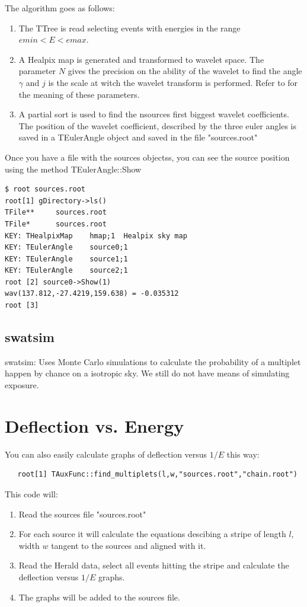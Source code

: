 \documentclass[12pt]{article}
\begin{document}
The algorithm goes as follows:
\begin{enumerate}
\item The TTree is read selecting events with energies in the range $emin < E < emax$.
\item A Healpix map is generated and transformed to wavelet space. The parameter $N$
gives the precision on the ability of the wavelet to find the angle $\gamma$ and $j$
is the scale at witch the wavelet transform is performed. Refer to \cite{gap} for
the meaning of these parameters.
\item A partial sort is used to find the nsources first biggest wavelet coefficients.
The position of the wavelet coefficient, described by the three euler angles is
saved in a TEulerAngle object and saved in the file {\color{brown}"sources.root"}
\end{enumerate}
Once you have a file with the sources objectss, you can see the source position using
the method {\color{brown}TEulerAngle::Show}
{ \color{brown}
\begin{lstlisting}
$ root sources.root
root[1] gDirectory->ls()
TFile**		sources.root	
TFile*		sources.root	
KEY: THealpixMap	hmap;1	Healpix sky map
KEY: TEulerAngle	source0;1	
KEY: TEulerAngle	source1;1	
KEY: TEulerAngle	source2;1	
root [2] source0->Show(1)
wav(137.812,-27.4219,159.638) = -0.035312
root [3] 
\end{lstlisting}
}

\subsection{swatsim}
swatsim: Uses Monte Carlo simulations to calculate the probability of a multiplet happen by 
chance on a isotropic sky. We still do not have means of simulating exposure.

\section{Deflection vs. Energy} \label{ch::raios-cosmicos}
You can also easily calculate graphs of deflection versus $1/E$ this way:
{ \color{brown}
   \begin{lstlisting}
   root[1] TAuxFunc::find_multiplets(l,w,"sources.root","chain.root")
   \end{lstlisting}
}
This code will:
\begin{enumerate}
\item Read the sources file {\color{brown}"sources.root"}
\item For each source it will calculate the equations descibing a stripe of
length $l$, width $w$ tangent to the sources and aligned with it.
\item Read the Herald data, select all events hitting the stripe and calculate 
the deflection versus $1/E$ graphs.
\item The graphs will be added to the sources file.
\end{enumerate}
\end{document}
